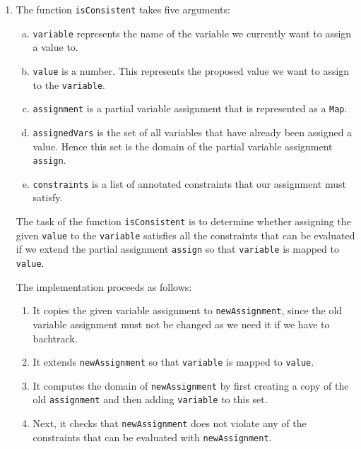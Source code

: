 \begin{enumerate}
  The implementation proceeds as follows:
  \begin{enumerate}
  \item It creates two lists \texttt{argNames} and \texttt{argValues}.  \texttt{argNames} is a list of the
    variable names, while \texttt{argValues} contains the corresponding values that are given in the variable
    assignment \texttt{assign}.
  \item It dynamically creates a new function \texttt{func} that returns the given expression \texttt{expr}.
  \item Finally, it calls this function with the corresponding argument and returns the value computed by the
        dynamically created function.  This way, we can evaluate arbitrary expressions.
      \end{enumerate}
\item The function \texttt{isConsistent} takes five arguments:
  \begin{enumerate}[(a)]
  \item \texttt{variable} represents the name of the variable we currently want to assign a value to.
  \item \texttt{value} is a number. This represents the proposed value we want to assign to the \texttt{variable}.
  \item \texttt{assignment} is a partial variable assignment that is represented as a \texttt{Map}. 
  \item \texttt{assignedVars} is the set of all variables that have already been assigned a value.
        Hence this set is the domain of the partial variable assignment \texttt{assign}.
  \item \texttt{constraints} is a list of annotated constraints that our assignment must satisfy.
  \end{enumerate}
  The task of the function \texttt{isConsistent} is to determine whether assigning the given \texttt{value} to
  the \texttt{variable} satisfies all the constraints that can be evaluated if we extend the partial assignment
  \texttt{assign} so that \texttt{variable} is mapped to \texttt{value}.
  
  The implementation proceeds as follows:
  \begin{enumerate}
  \item It copies the given variable assignment to \texttt{newAssignment}, since the old variable assignment
        must not be changed as we need it if we have to bachtrack.
  \item It extends \texttt{newAssignment} so that \texttt{variable} is mapped to \texttt{value}.
  \item It computes the domain of \texttt{newAssignment} by first creating a copy of the old
        \texttt{assignment} and then adding \texttt{variable} to this set.
  \item Next, it checks that \texttt{newAssignment} does not violate any of the constraints that can be
        evaluated with \texttt{newAssignment}.


\end{enumerate}
\end{enumerate}

